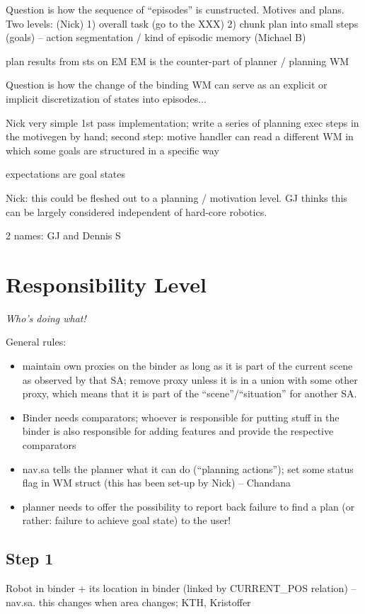 \documentclass{article}
\begin{document}
Question is how the sequence of ``episodes'' is cunstructed.
Motives and plans. Two levels: (Nick)
1) overall task (go to the XXX)
2) chunk plan into small steps (goals) -- action segmentation / kind of episodic memory (Michael B)

plan results from sts on EM
EM is the counter-part of planner / planning WM


Question is how the change of the binding WM can serve as an explicit or implicit 
discretization of states into episodes...


Nick very simple 1st pass implementation; write a series of planning exec steps in the motivegen
by hand; second step: motive handler can read a different WM in which some goals are
structured in a specific way

expectations are goal states

Nick: this could be fleshed out to a planning / motivation level.
GJ thinks this can be largely considered independent of hard-core robotics.

2 names: GJ and Dennis S


\section{Responsibility Level}

\textit{Who's doing what!}

General rules:
\begin{itemize}
	\item maintain own proxies on the binder as long as it is
	part of the current scene as observed by that SA; remove proxy
	unless it is in a union with some other proxy, which means that
	it is part of the ``scene''/``situation'' for another SA.
	\item Binder needs comparators; whoever is responsible for putting
		stuff in the binder is also responsible for adding features and
		provide the respective comparators
	\item nav.sa tells the planner what it can do (``planning actions'');
		set some status flag in WM struct (this has been set-up by Nick) -- Chandana
	\item planner needs to offer the possibility to report back failure to find a plan
		(or rather: failure to achieve goal state) to the user!
\end{itemize}

\subsection{Step 1}
Robot in binder + its location in binder (linked by CURRENT\_POS relation) -- nav.sa.
this changes when area changes;
KTH, Kristoffer
\end{document}
